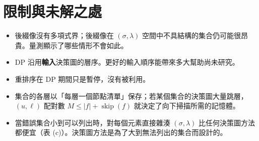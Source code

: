 \documentclass[a4paper,11pt,fontset=none]{ctexart}
\renewcommand{\emph}[1]{\textbf{#1}}
\DeclareMathOperator{\skipc}{skip}
\theoremstyle{definition}
\begin{document}
\section{限制與未解之處}

\begin{itemize}[leftmargin=1.5em]
\item 後綴像沒有多項式界；後綴像在 $(\sigma,\lambda)$ 空間中不具結構的集合仍可能很昂貴。量測顯示了哪些情形不會如此。
\item DP 沿用\emph{輸入}決策圖的層序。更好的輸入順序能帶來多大幫助尚未研究。
\item 重排序在 DP 期間只是暫停，沒有被利用。
\item 集合的各層以「每層一個節點清單」保存；若某個集合的決策圖大量跳層，$(u,\ell)$ 配對數 $M\le\lvert f\rvert+\skipc(f)$ 就決定了向下掃描所需的記憶體。
\item 當錯誤集合小到可以列出時，對每個元素直接雜湊 $(\sigma,\lambda)$ 比任何決策圖方法都便宜（表 (c)）。決策圖方法是為了大到無法列出的集合而設計的。
\end{itemize}
\end{document}
